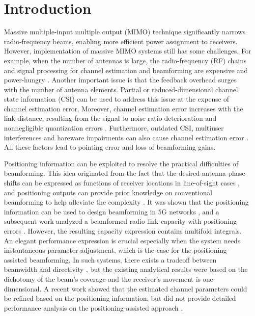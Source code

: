 \documentclass{IEEEtran}
\begin{document}
\section{Introduction}
Massive multiple-input multiple output (MIMO) technique significantly narrows radio-frequency beams, enabling more {{efficient}} power assignment to receivers. However, implementation of massive MIMO systems still {{has}} some challenges. For example, {{when the number of antennas is large, the radio-frequency (RF) chains and signal processing for channel estimation and beamforming are expensive and power-hungry} \cite{HybridBeamforming5G_Magz,HybridBeamforming_Molisch}}. Another important issue is that the feedback overhead surges with the number of antenna elements. Partial or reduced-dimensional channel state information (CSI) \cite{3DBeamforming_SPM2014} can be used to address this issue at the expense of channel estimation error.  Moreover, channel estimation error increases with the link distance, resulting from the signal-to-noise ratio deterioration and nonnegligible quantization errors \cite{BeamformingError_CL}. Furthermore, outdated CSI, multiuser interferences and hareware impairments can also cause channel estimation error \cite{OutdatedChannelEstError,PhaseShifterImpairment_SPL}. All these factors lead to pointing error and loss of beamforming gains.


Positioning information can be exploited to resolve the practical difficulties of beamforming. This idea originated from the fact that the desired antenna phase shifts can be expressed as functions of receiver locations in line-of-sight cases \cite{LocationBeamforming,WangW_IRS_BF_Positioning2021}, and {{positioning outputs can provide prior knowledge on conventional beamforming to help alleviate the complexity \cite{MultiLevelBeamforming_CL,PA_beamforming_Access,Bidirectional_Positioning_BeamformingTCOM}.}} It was shown that the positioning information can be used to design beamforming in 5G networks \cite{PositioningRailway5G_Mag}, and a subsequent work analyzed a beamformed radio link capacity with positioning errors \cite{BeamformingPositioningError_TVT}. However, the resulting capacity expression contains multifold integrals. An elegant performance expression is crucial especially when the system needs instantaneous parameter adjustment, which is the case for the positioning-assisted beamforming. In such systems, there exists a tradeoff between beamwidth and directivity \cite{BeamwidthTradeoff}, but the existing analytical results were based on the dichotomy of the beam's coverage and the receiver's movement is one-dimensional. A recent work showed that the estimated channel parameters could be refined based on the positioning information, but did not provide detailed performance analysis on the positioning-assisted approach \cite{WangW_IRS_BF_Positioning2021}.
\end{document}
